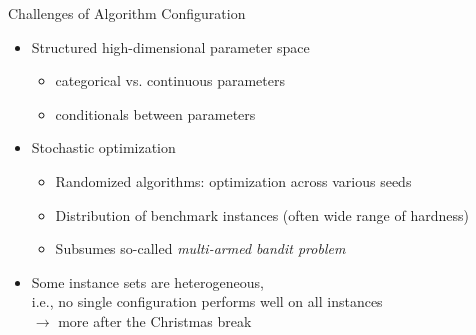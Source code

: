 \begin{frame}[c]{Challenges of Algorithm Configuration}

\begin{itemize}
  \item \alert{Structured high-dimensional parameter space}
	\begin{itemize}
	  \item categorical vs. continuous parameters
	  \item conditionals between parameters
	\end{itemize}
  \pause
  \medskip
  \item \alert{Stochastic optimization}
  \begin{itemize}
    \item Randomized algorithms: optimization across various seeds
    \item Distribution of benchmark instances (often wide range of hardness)
    \item Subsumes so-called \emph{multi-armed bandit problem}
  \end{itemize}
  \pause
  \medskip
  \item Some instance sets are \alert{heterogeneous},\\i.e., no single configuration performs well on all instances\\ 
  $\to$ more after the Christmas break
\end{itemize}


\end{frame}





